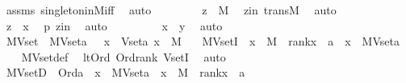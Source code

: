 \begin{isabellebody}
\ assms\ singleton{\isacharunderscore}{\kern0pt}in{\isacharunderscore}{\kern0pt}M{\isacharunderscore}{\kern0pt}iff\ \isamarkupfalse%
\ auto\ \isanewline
\ \ \ \ \isamarkupfalse%
\ \isamarkupfalse%
\ {\isachardoublequoteopen}z\ {\isasymin}\ M{\isachardoublequoteclose}\ \isamarkupfalse%
\ zin\ transM\ \isamarkupfalse%
\ auto\ \isanewline
\ \ \ \ \isamarkupfalse%
\ \isamarkupfalse%
\ {\isachardoublequoteopen}z\ {\isasymin}\ x{\isachardoublequoteclose}\ \isamarkupfalse%
\ p\ zin\ \isamarkupfalse%
\ auto\ \isanewline
\ \ \isamarkupfalse%
\isanewline
\ \ \isamarkupfalse%
\ \isamarkupfalse%
\ {\isachardoublequoteopen}x\ {\isacharequal}{\kern0pt}\ {\isacharbraceleft}{\kern0pt}y{\isacharbraceright}{\kern0pt}{\isachardoublequoteclose}\ \isamarkupfalse%
\ auto\ \isanewline
{}\isamarkupfalse%
%
\endisatagproof
{\isafoldproof}%
%
\isadelimproof
\isanewline
%
\endisadelimproof
\isanewline
{}\isamarkupfalse%
\ MVset\ \ {\isachardoublequoteopen}MVset{\isacharparenleft}{\kern0pt}a{\isacharparenright}{\kern0pt}\ {\isasymequiv}\ {\isacharbraceleft}{\kern0pt}\ x\ {\isasymin}\ Vset{\isacharparenleft}{\kern0pt}a{\isacharparenright}{\kern0pt}{\isachardot}{\kern0pt}\ x\ {\isasymin}\ M\ {\isacharbraceright}{\kern0pt}{\isachardoublequoteclose}\ \isanewline
\isanewline
{}\isamarkupfalse%
\ MVsetI\ {\isacharcolon}{\kern0pt}\ {\isachardoublequoteopen}x\ {\isasymin}\ M\ {\isasymLongrightarrow}\ rank{\isacharparenleft}{\kern0pt}x{\isacharparenright}{\kern0pt}\ {\isacharless}{\kern0pt}\ a\ {\isasymLongrightarrow}\ x\ {\isasymin}\ MVset{\isacharparenleft}{\kern0pt}a{\isacharparenright}{\kern0pt}{\isachardoublequoteclose}\ \isanewline
%
\isadelimproof
\ \ %
\endisadelimproof
%
\isatagproof
{}\isamarkupfalse%
\ MVset{\isacharunderscore}{\kern0pt}def\ \isamarkupfalse%
\ lt{\isacharunderscore}{\kern0pt}Ord{}\ Ord{\isacharunderscore}{\kern0pt}rank\ VsetI\ \isamarkupfalse%
\ auto%
\endisatagproof
{\isafoldproof}%
%
\isadelimproof
\isanewline
%
\endisadelimproof
\isanewline
{}\isamarkupfalse%
\ MVsetD\ {\isacharcolon}{\kern0pt}\ {\isachardoublequoteopen}Ord{\isacharparenleft}{\kern0pt}a{\isacharparenright}{\kern0pt}\ {\isasymLongrightarrow}\ x\ {\isasymin}\ MVset{\isacharparenleft}{\kern0pt}a{\isacharparenright}{\kern0pt}\ {\isasymLongrightarrow}\ x\ {\isasymin}\ M\ {\isasymand}\ rank{\isacharparenleft}{\kern0pt}x{\isacharparenright}{\kern0pt}\ {\isacharless}{\kern0pt}\ a{\isachardoublequoteclose}\ \isanewline

\end{isabellebody}
